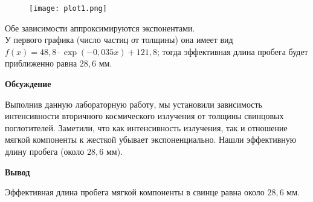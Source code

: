 \documentclass[12pt]{article}
\begin{document}
\begin{figure}[ht]
    \centering
    \texttt{[image: plot1.png]}
    \label{fig:plot1}
\end{figure}
\FloatBarrier
Обе зависимости аппроксимируются экспонентами.
\\
У первого графика (число частиц от толщины) она имеет вид $f(x) = 48,8\cdot
\exp(-0,035x) + 121,8$; тогда эффективная длина пробега будет приближенно равна
$28,6$ мм.
\newpage
\begin{center}
    \textbf{Обсуждение}
\end{center}
Выполнив данную лабораторную работу, мы установили зависимость интенсивности
вторичного космического излучения от толщины свинцовых поглотителей. Заметили,
что как интенсивность излучения, так и отношение мягкой компоненты к жесткой
убывает экспоненциально. Нашли эффективную длину пробега (около $28,6$ мм).
\begin{center}
    \textbf{Вывод}
\end{center}
Эффективная длина пробега мягкой компоненты в свинце равна около $28,6$ мм.
\end{document}
